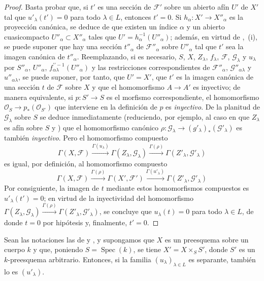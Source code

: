 \begin{proof}
Basta probar que, si $t'$ es una sección de $\mathcal F'$ sobre un abierto afín $U'$ de $X'$ tal que $u'_\lambda(t')=0$ para todo $\lambda\in L$, entonces $t'=0$.
Si $h_\alpha:X'\to X''_\alpha$ es la proyección canónica,
se deduce de  que existen un índice $\alpha$ y un abierto cuasicompacto $U''_\alpha\subset X''_\alpha$ tales que $U'=h_\alpha^{-1}(U''_\alpha)$; además, en virtud de ,~(i), se puede suponer que hay una sección $t''_\alpha$ de $\mathcal F''_\alpha$ sobre $U''_\alpha$ tal que $t'$ sea la imagen canónica de $t''_\alpha$.
Reemplazando, si es necesario, $S$, $X$, $Z_\lambda$, $f_\lambda$, $\mathcal F$, $\mathcal G_\lambda$ y $u_\lambda$ por $S''_\alpha$, $U''_\alpha$, $f^{\prime\prime-1}_{\alpha\lambda}(U''_\alpha)$ y las restricciones correspondientes de $\mathcal F''_\alpha$, $\mathcal G''_{\alpha\lambda}$ y $u''_{\alpha\lambda}$, se puede suponer, por tanto, que $U'=X'$, que $t'$ es la imagen canónica de una sección $t$ de $\mathcal F$ sobre $X$ y que el homomorfismo $A\to A'$ es inyectivo; de manera equivalente, si $p:S'\to S$ es el morfismo correspondiente, el homomorfismo $\mathcal O_S\to p_*(\mathcal O_{S'})$ que interviene en la definición de $p$ es \emph{inyectivo}.
De la planitud de $\mathcal G_\lambda$ sobre $S$ se deduce inmediatamente (reduciendo, por ejemplo, al caso en que $Z_\lambda$ es afín sobre $S$  y ) que el homomorfismo canónico $\rho:\mathcal G_\lambda\to(g'_\lambda)_*(\mathcal G'_\lambda)$ es también \emph{inyectivo}.
Pero el homomorfismo compuesto
\[
\Gamma(X,\mathcal F)\xrightarrow{\Gamma(u_\lambda)}
\Gamma(Z_\lambda,\mathcal G_\lambda)\xrightarrow{\Gamma(\rho)}
\Gamma(Z'_\lambda,\mathcal G'_\lambda)
\]
es igual, por definición, al homomorfismo compuesto
\[
\Gamma(X,\mathcal F)\xrightarrow{\Gamma(\rho)}
\Gamma(X',\mathcal F')\xrightarrow{\Gamma(u'_\lambda)}
\Gamma(Z'_\lambda,\mathcal G'_\lambda)
\]
Por consiguiente, la imagen de $t$ mediante estos homomorfismos compuestos es $u'_\lambda(t')=0$; en virtud de la inyectividad del homomorfismo $\Gamma(Z_\lambda,\mathcal G_\lambda)\xrightarrow{\Gamma(\rho)}
\Gamma(Z'_\lambda,\mathcal G'_\lambda)$, se concluye que $u_\lambda(t)=0$ para todo $\lambda\in L$, de donde $t=0$ por hipótesis y, finalmente, $t'=0$.
\end{proof}

\begin{proposition}[11.9.13]
\label{IV.11.9.13}
Sean las notaciones las de  y , y supongamos que $X$ es un preesquema sobre un cuerpo $k$ y que, poniendo $S=\operatorname{Spec}(k)$, se tiene $X'=X\times_S S'$, donde $S'$ es un $k$-preesquema arbitrario.
Entonces, si la familia $(u_\lambda)_{\lambda\in L}$ es separante, también lo es $(u'_\lambda)$.
\end{proposition}

